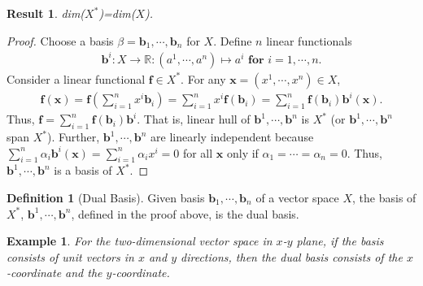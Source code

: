 \documentclass[letterpaper,12pt]{article}
\theoremstyle{plain}
\newtheorem{res}{Result}
\theoremstyle{plain}
\newtheorem{exmp}{Example}
\theoremstyle{definition}
\newtheorem{defn}{Definition}
\begin{document}
\begin{res} dim($X^*$)=dim($X$).\label{resdim}
\end{res}
\begin{proof}
Choose a basis $\beta=\mathbf{b}_1,\cdots,\mathbf{b}_n$ for $X$. Define $n$ linear functionals
\begin{align*}
\mathbf{b}^i:X\rightarrow \mathbb{R}:(a^1,\cdots,a^n)\mapsto a^i \textbf{ for }i=1,\cdots,n.
\end{align*}
Consider a linear functional $\mathbf{f}\in X^*$. For any $\mathbf{x}=(x^1,\cdots,x^n)\in X$,
\begin{align*}
\mathbf{f}(\mathbf{x})=\mathbf{f}(\sum_{i=1}^n x^i \mathbf{b}_i)=\sum_{i=1}^n x^i \mathbf{f}(\mathbf{b}_i)=\sum_{i=1}^n \mathbf{f}(\mathbf{b}_i) \mathbf{b}^i(\mathbf{x}).
\end{align*}
Thus, $\mathbf{f}=\sum_{i=1}^n \mathbf{f}(\mathbf{b}_i) \mathbf{b}^i$. That is, linear hull of $\mathbf{b}^1,\cdots,\mathbf{b}^n$ is $X^*$ (or $\mathbf{b}^1,\cdots,\mathbf{b}^n$ span $X^*$). Further, $\mathbf{b}^1,\cdots,\mathbf{b}^n$ are linearly independent because $\sum_{i=1}^n \alpha_i \mathbf{b}^i(\mathbf{x})=\sum_{i=1}^n \alpha_i x^i=0$ for all $\mathbf{x}$ only if $\alpha_1=\cdots=\alpha_n=0$. Thus, $\mathbf{b}^1,\cdots,\mathbf{b}^n$ is a basis of $X^*$.
\end{proof}
\begin{defn}[Dual Basis]\label{defdbas}
Given basis $\mathbf{b}_1,\cdots,\mathbf{b}_n$ of a vector space $X$, the basis of $X^*$, $\mathbf{b}^1,\cdots,\mathbf{b}^n$, defined in the proof above, is the dual basis.
\end{defn}

\begin{exmp}
For the two-dimensional vector space in $x$-$y$ plane, if the basis consists of unit vectors in $x$ and $y$ directions, then the dual basis consists of the $x$-coordinate and the $y$-coordinate.
\end{exmp}

\clearpage
\end{document}
